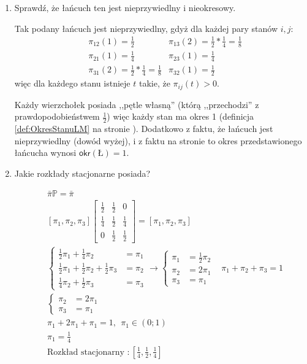 \begin{enumerate}[label=\alph*)]
\item Sprawdź, że łańcuch ten jest nieprzywiedlny i nieokresowy.

Tak podany łańcuch jest nieprzywiedlny, gdyż dla każdej pary stanów $i,j$:
\begin{align*}
&\pi _{12}(1) = \frac{1}{2} &\pi _{13}(2) = \frac{1}{2}*\frac{1}{4}=\frac{1}{8}\\
&\pi _{21}(1) =\frac{1}{4} &\pi _{23}(1) =\frac{1}{4}\\
&\pi _{31}(2) =\frac{1}{2}*\frac{1}{4}=\frac{1}{8}&\pi _{32}(1) =\frac{1}{2}
\end{align*}
więc dla każdego stanu istnieje $t$ takie, że $\pi_{ij}(t)>0$.

Każdy wierzchołek posiada ,,pętle własną'' (którą ,,przechodzi'' z prawdopodobieństwem $\frac{1}{2}$) więc każdy stan ma okres 1 (definicja \ref{def:OkresStanuLM} na stronie \pageref{def:OkresStanuLM}). Dodatkowo z faktu, że łańcuch jest nieprzywiedlny (dowód wyżej), i z faktu na stronie \pageref{fac:OkresLM} to okres przedstawionego łańcucha wynosi $\mathsf{okr}(Ł)=1$.
\item Jakie rozkłady stacjonarne posiada?

\begin{align*}
&\bar{\pi}\mathbb{P}=\bar{\pi}\\
&\left[\pi _1, \pi _2,\pi _3\right]\begin{bmatrix}
\frac{1}{2}&\frac{1}{2}&0\\
\frac{1}{4}&\frac{1}{2}&\frac{1}{4}\\
0&\frac{1}{2}&\frac{1}{2}
\end{bmatrix}=\left[\pi _1, \pi _2,\pi _3\right]\\
&\left\{\begin{matrix}
\frac{1}{2}\pi _1 + \frac{1}{4}\pi _2&=\pi _1\\
\frac{1}{2}\pi _1+\frac{1}{2}\pi _2+\frac{1}{2}\pi _3&=\pi _2\\
\frac{1}{4}\pi _2+\frac{1}{2}\pi _3 &=\pi _3
\end{matrix}\right. \rightarrow \left\{\begin{matrix}
\pi _1 &=\frac{1}{2}\pi _2\\
\pi _2 &= 2\pi _1\\
\pi _3&= \pi _1
\end{matrix}\right.
&\pi _1 + \pi_2 + \pi _3 = 1\\
&\left\{\begin{matrix}
\pi _2 &= 2\pi _1\\
\pi _3&= \pi _1
\end{matrix}\right.\\
&\pi _1 + 2\pi _1 + \pi _1 = 1, \ \ \pi _1\in (0;1)\\
&\pi _1 = \frac{1}{4}\\
&\text{Rozkład stacjonarny }:\left[\frac{1}{4}, \frac{1}{2}, \frac{1}{4}\right]
\end{align*}


\end{enumerate}
